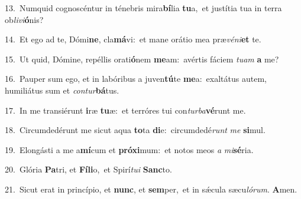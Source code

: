 {\numbfont\textcolor{\numbcolor}{13.}}~Numquid cognoscéntur in ténebris mira\-\textbf{bí}\-lia \textbf{tu}\-a,~\star et justítia tua in terra ob\-\textit{li}\-\textit{vi}\textbf{ó}nis?\par
{\numbfont\textcolor{\numbcolor}{14.}}~Et ego ad te, Dómi\-\textbf{ne}\-, cla\-\textbf{má}\-vi:~\star et mane orátio mea præ\-\textit{vé}\-\textit{ni}\textbf{et} te.\par
{\numbfont\textcolor{\numbcolor}{15.}}~Ut quid, Dómine, repéllis orati\-\textbf{ó}\-nem \textbf{me}\-am:~\star avértis fáciem \textit{tu}\-\textit{am} \textbf{a} me?\par
{\numbfont\textcolor{\numbcolor}{16.}}~Pauper sum ego, et in labóribus a juven\-\textbf{tú}\-te \textbf{me}\-a:~\star exaltátus autem, humiliátus sum et \textit{con}\-\textit{tur}\textbf{bá}tus.\par
{\numbfont\textcolor{\numbcolor}{17.}}~In me transiérunt \textbf{i}\-ræ \textbf{tu}\-æ:~\star et terróres tui con\-\textit{tur}\-\textit{ba}\textbf{vé}runt me.\par
{\numbfont\textcolor{\numbcolor}{18.}}~Circumdedérunt me sicut aqua \textbf{to}\-ta \textbf{di}\-e:~\star circumdedé\textit{runt} \textit{me} \textbf{si}\-mul.\par
{\numbfont\textcolor{\numbcolor}{19.}}~Elongásti a me a\-\textbf{mí}\-cum et \textbf{pró}\-\textbf{xi}mum:~\star et notos meos \textit{a} \textit{mi}\-\textbf{sé}ria.\par
{\numbfont\textcolor{\numbcolor}{20.}}~Glória \textbf{Pa}\-tri, et \textbf{Fí}\-\textbf{li}o,~\star et Spirí\-\textit{tu}\-\textit{i} \textbf{Sanc}\-to.\par
{\numbfont\textcolor{\numbcolor}{21.}}~Sicut erat in princípio, et \textbf{nunc}\-, et \textbf{sem}\-per,~\star et in sǽcula sæcu\-\textit{ló}\-\textit{rum}. \textbf{A}\-men.\par
